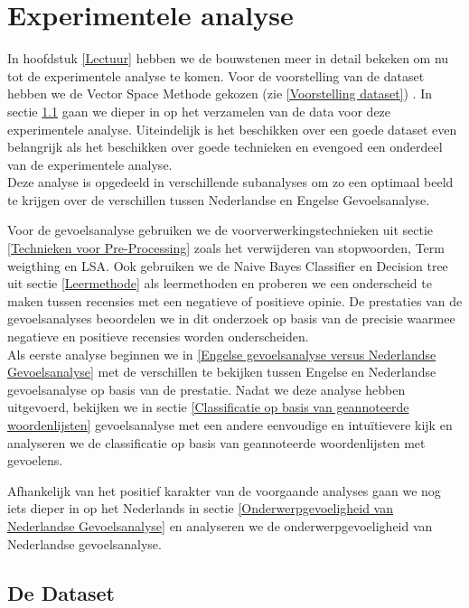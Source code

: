 \chapter{Experimentele analyse}\label{Experiment}

In hoofdstuk \ref{Lectuur} hebben we de bouwstenen meer in detail bekeken om nu tot de experimentele analyse te komen. Voor de voorstelling van de dataset hebben we de Vector Space Methode gekozen (zie \ref{Voorstelling dataset}) . In sectie \ref{De Dataset} gaan we dieper in op het verzamelen van de data voor deze experimentele analyse. Uiteindelijk is het beschikken over een goede dataset even belangrijk als het beschikken over goede technieken en evengoed een onderdeel van de experimentele analyse.\\
Deze analyse is opgedeeld in verschillende subanalyses om zo een optimaal beeld te krijgen over de verschillen tussen Nederlandse en Engelse Gevoelsanalyse. 

Voor de gevoelsanalyse gebruiken we de voorverwerkingstechnieken uit sectie \ref{Technieken voor Pre-Processing} zoals het verwijderen van stopwoorden, Term weigthing en LSA. Ook gebruiken we de Naive Bayes Classifier en Decision tree uit sectie \ref{Leermethode} als leermethoden en proberen we een onderscheid te maken tussen recensies met een negatieve of positieve opinie. De prestaties van de gevoelsanalyses beoordelen we in dit onderzoek op basis van de precisie waarmee negatieve en positieve recensies worden onderscheiden.\\

Als eerste analyse beginnen we in \ref{Engelse gevoelsanalyse versus Nederlandse Gevoelsanalyse} met de verschillen te bekijken tussen Engelse en Nederlandse gevoelsanalyse op basis van de prestatie. Nadat we deze analyse hebben uitgevoerd, bekijken we in sectie \ref{Classificatie op basis van geannoteerde woordenlijsten} gevoelsanalyse met een andere eenvoudige en intu\"itievere kijk en analyseren we de classificatie op basis van geannoteerde woordenlijsten met gevoelens.

Afhankelijk van het positief karakter van de voorgaande analyses gaan we nog iets dieper in op het Nederlands in sectie \ref{Onderwerpgevoeligheid van Nederlandse Gevoelsanalyse} en analyseren we de onderwerpgevoeligheid van Nederlandse gevoelsanalyse.

\section{De Dataset}\label{De Dataset}

